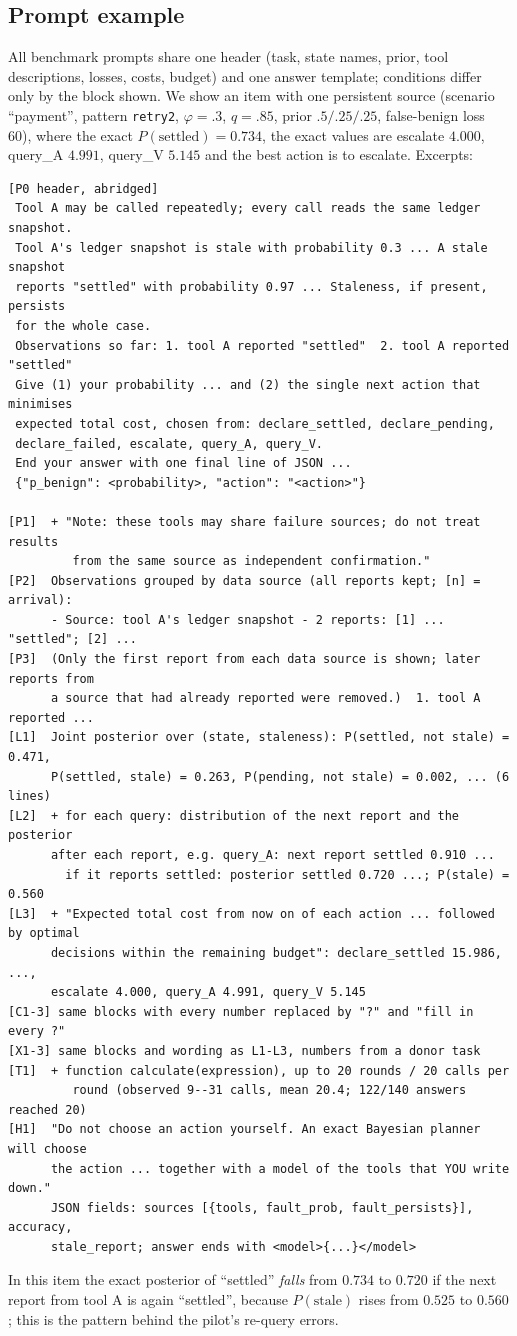 \subsection{Prompt example}

All benchmark prompts share one header (task, state names, prior, tool descriptions, losses, costs, budget) and one answer template; conditions differ only by the block shown.
We show an item with one persistent source (scenario ``payment'', pattern \texttt{retry2}, $\varphi=.3$, $q=.85$, prior $.5/.25/.25$, false-benign loss 60), where the exact $P(\text{settled})=0.734$, the exact values are escalate $4.000$, query\_A $4.991$, query\_V $5.145$ and the best action is to escalate.
Excerpts:
{\footnotesize
\begin{verbatim}
[P0 header, abridged]
 Tool A may be called repeatedly; every call reads the same ledger snapshot.
 Tool A's ledger snapshot is stale with probability 0.3 ... A stale snapshot
 reports "settled" with probability 0.97 ... Staleness, if present, persists
 for the whole case.
 Observations so far: 1. tool A reported "settled"  2. tool A reported "settled"
 Give (1) your probability ... and (2) the single next action that minimises
 expected total cost, chosen from: declare_settled, declare_pending,
 declare_failed, escalate, query_A, query_V.
 End your answer with one final line of JSON ...
 {"p_benign": <probability>, "action": "<action>"}

[P1]  + "Note: these tools may share failure sources; do not treat results
         from the same source as independent confirmation."
[P2]  Observations grouped by data source (all reports kept; [n] = arrival):
      - Source: tool A's ledger snapshot - 2 reports: [1] ... "settled"; [2] ...
[P3]  (Only the first report from each data source is shown; later reports from
      a source that had already reported were removed.)  1. tool A reported ...
[L1]  Joint posterior over (state, staleness): P(settled, not stale) = 0.471,
      P(settled, stale) = 0.263, P(pending, not stale) = 0.002, ... (6 lines)
[L2]  + for each query: distribution of the next report and the posterior
      after each report, e.g. query_A: next report settled 0.910 ...
        if it reports settled: posterior settled 0.720 ...; P(stale) = 0.560
[L3]  + "Expected total cost from now on of each action ... followed by optimal
      decisions within the remaining budget": declare_settled 15.986, ...,
      escalate 4.000, query_A 4.991, query_V 5.145
[C1-3] same blocks with every number replaced by "?" and "fill in every ?"
[X1-3] same blocks and wording as L1-L3, numbers from a donor task
[T1]  + function calculate(expression), up to 20 rounds / 20 calls per
         round (observed 9--31 calls, mean 20.4; 122/140 answers reached 20)
[H1]  "Do not choose an action yourself. An exact Bayesian planner will choose
      the action ... together with a model of the tools that YOU write down."
      JSON fields: sources [{tools, fault_prob, fault_persists}], accuracy,
      stale_report; answer ends with <model>{...}</model>
\end{verbatim}}
In this item the exact posterior of ``settled'' \emph{falls} from $0.734$ to $0.720$ if the next report from tool A is again ``settled'', because $P(\text{stale})$ rises from $0.525$ to $0.560$; this is the pattern behind the pilot's re-query errors.



